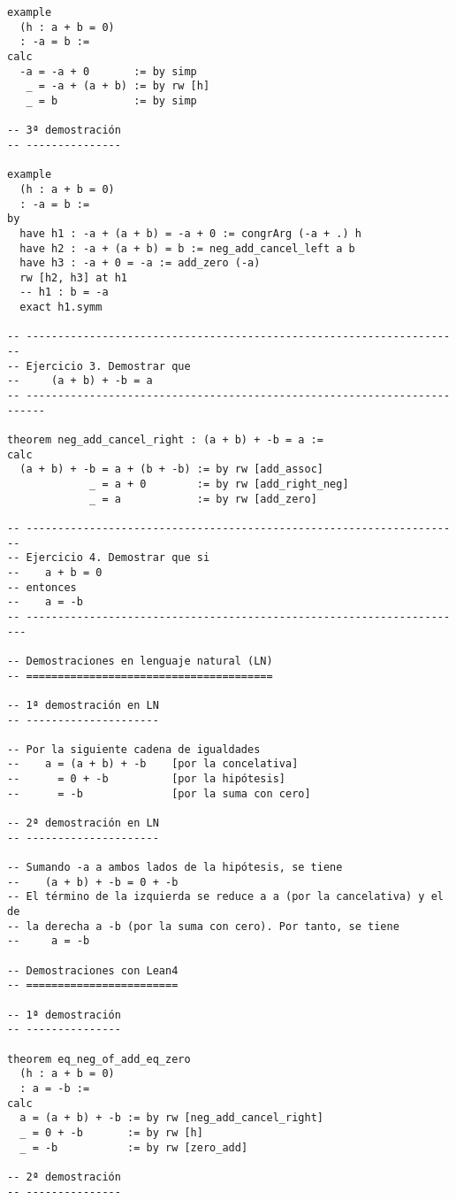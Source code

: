 \begin{verbatim}
example
  (h : a + b = 0)
  : -a = b :=
calc
  -a = -a + 0       := by simp
   _ = -a + (a + b) := by rw [h]
   _ = b            := by simp

-- 3ª demostración
-- ---------------

example
  (h : a + b = 0)
  : -a = b :=
by
  have h1 : -a + (a + b) = -a + 0 := congrArg (-a + .) h
  have h2 : -a + (a + b) = b := neg_add_cancel_left a b
  have h3 : -a + 0 = -a := add_zero (-a)
  rw [h2, h3] at h1
  -- h1 : b = -a
  exact h1.symm

-- ---------------------------------------------------------------------
-- Ejercicio 3. Demostrar que
--     (a + b) + -b = a
-- -------------------------------------------------------------------------

theorem neg_add_cancel_right : (a + b) + -b = a :=
calc
  (a + b) + -b = a + (b + -b) := by rw [add_assoc]
             _ = a + 0        := by rw [add_right_neg]
             _ = a            := by rw [add_zero]

-- ---------------------------------------------------------------------
-- Ejercicio 4. Demostrar que si
--    a + b = 0
-- entonces
--    a = -b
-- ----------------------------------------------------------------------

-- Demostraciones en lenguaje natural (LN)
-- =======================================

-- 1ª demostración en LN
-- ---------------------

-- Por la siguiente cadena de igualdades
--    a = (a + b) + -b    [por la concelativa]
--      = 0 + -b          [por la hipótesis]
--      = -b              [por la suma con cero]

-- 2ª demostración en LN
-- ---------------------

-- Sumando -a a ambos lados de la hipótesis, se tiene
--    (a + b) + -b = 0 + -b
-- El término de la izquierda se reduce a a (por la cancelativa) y el de
-- la derecha a -b (por la suma con cero). Por tanto, se tiene
--     a = -b

-- Demostraciones con Lean4
-- ========================

-- 1ª demostración
-- ---------------

theorem eq_neg_of_add_eq_zero
  (h : a + b = 0)
  : a = -b :=
calc
  a = (a + b) + -b := by rw [neg_add_cancel_right]
  _ = 0 + -b       := by rw [h]
  _ = -b           := by rw [zero_add]

-- 2ª demostración
-- ---------------


\end{verbatim}

